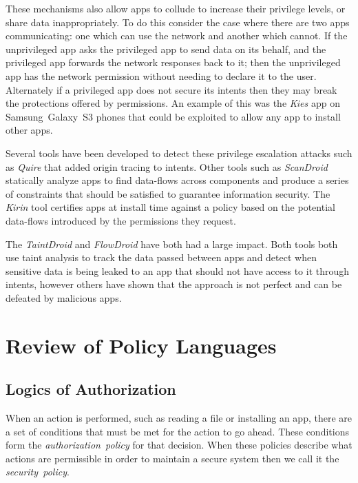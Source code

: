 \documentclass[a4paper,sfsidenotes]{tufte-book}
\begin{document}
These mechanisms also allow apps to collude to increase their privilege levels,
or share data inappropriately. To do this consider the case where there are two
apps communicating: one which can use the network and another which cannot. If
the unprivileged app asks the privileged app to send data on its behalf, and the
privileged app forwards the network responses back to it; then the unprivileged
app has the network permission without needing to declare it to the user.
Alternately if a privileged app does not secure its intents then they may break
the protections offered by permissions. An example of this was the \emph{Kies}
app on Samsung~Galaxy~S3 phones that could be exploited to allow any app to
install other apps\cite{moulu:8btkPowj}.

Several tools have been developed to detect these privilege escalation attacks
such as \emph{Quire}\cite{Bugiel:2012ui} that added origin tracing to intents.
Other tools such as \emph{ScanDroid}\cite{Fuchs:2009vi} statically analyze apps
to find data-flows across components and produce a series of constraints that
should be satisfied to guarantee information security. The
\emph{Kirin}\cite{Enck:2009ko} tool certifies apps at install time against a
policy based on the potential data-flows introduced by the permissions they
request.

The \emph{TaintDroid}\cite{Enck:2010uw} and \emph{FlowDroid}\cite{Fritz:2013vi}
have both had a large impact. Both tools both use taint analysis to track the
data passed between apps and detect when sensitive data is being leaked to an
app that should not have access to it through intents, however others have shown
that the approach is not perfect\cite{Sarwar:2013ta} and can be defeated by
malicious apps.


\section{Review of Policy Languages}\label{sec:pollang}

\subsection{Logics of Authorization}

When an action is performed, such as reading a file or installing an app, there
are a set of conditions that must be met for the action to go ahead. These
conditions form the \emph{authorization~policy} for that decision. When these
policies describe what actions are permissible in order to maintain a secure
system then we call it the \emph{security~policy}.
\end{document}
